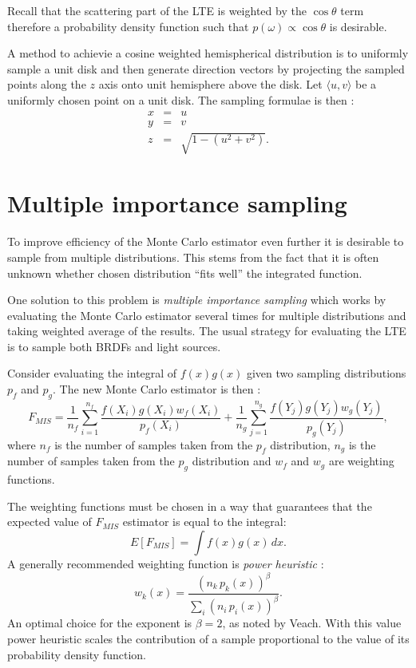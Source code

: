 Recall that the scattering part of the LTE is weighted by the $\cos\theta$ term therefore a probability density function such that $p(\omega) \propto \cos\theta$ is desirable.

A method to achievie a cosine weighted hemispherical distribution is to uniformly sample a unit disk and then generate direction vectors by projecting the sampled points along the $z$ axis onto unit hemisphere above the disk.
Let $\langle u, v \rangle$ be a uniformly chosen point on a unit disk. The sampling formulae is then \parencite{shirley97}:
\begin{eqnarray}
  x &=& u \nonumber \\
  y &=& v \nonumber \\
  z &=& \sqrt{1 - (u^{2} + v^{2})}.
\end{eqnarray}

\section{Multiple importance sampling}
To improve efficiency of the Monte Carlo estimator even further it is desirable to sample from multiple distributions. This stems from the fact that it is often unknown whether chosen distribution ``fits well'' the integrated function.

One solution to this problem is \emph{multiple importance sampling} which works by evaluating the Monte Carlo estimator several times for multiple distributions and taking weighted average of the results. The usual strategy for evaluating the LTE is to sample both BRDFs and light sources.

Consider evaluating the integral of $f(x)g(x)$ given two sampling distributions $p_{f}$ and $p_{g}$. The new Monte Carlo estimator is then \parencite{phar2010}:
\begin{equation}
  F_{MIS} = 
  \frac{1}{n_{f}} \sum_{i=1}^{n_{f}} \frac{f(X_{i})g(X_{i})w_{f}(X_{i})}{p_{f}(X_{i})} + 
  \frac{1}{n_{g}} \sum_{j=1}^{n_{g}} \frac{f(Y_{j})g(Y_{j})w_{g}(Y_{j})}{p_{g}(Y_{j})},
\end{equation}
where $n_{f}$ is the number of samples taken from the $p_{f}$ distribution, $n_{g}$ is the number of samples taken from the $p_{g}$ distribution and $w_{f}$ and $w_{g}$ are weighting functions.

The weighting functions must be chosen in a way that guarantees that the expected value of $F_{MIS}$ estimator is equal to the integral:
\begin{equation}
  E[F_{MIS}] = \int f(x)g(x) \,dx.
\end{equation}
A generally recommended weighting function is \emph{power heuristic} \parencite{veach97}:
\begin{equation}
  w_{k}(x) = \frac{(n_{k}\,p_{k}(x))^{\beta}}{\sum_{i}(n_{i}\,p_{i}(x))^{\beta}}.
\end{equation}
An optimal choice for the exponent is $\beta = 2$, as noted by Veach. With this value power heuristic scales the contribution of a sample proportional to the value of its probability density function.